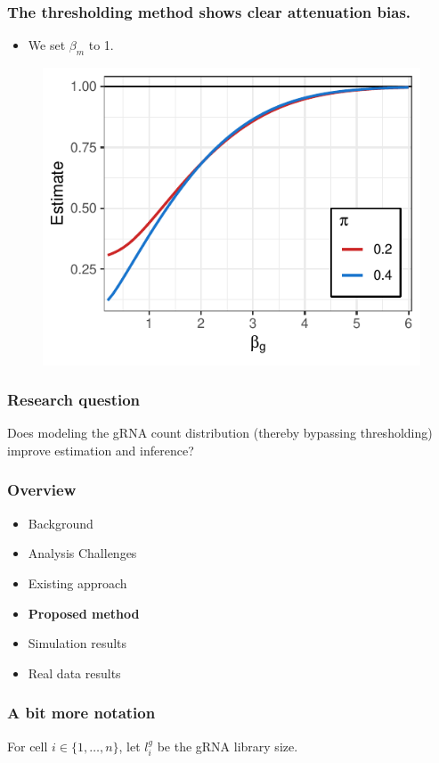 \documentclass{beamer}
\begin{document}
\begin{frame}
\frametitle{The thresholding method shows clear attenuation bias.}
\begin{itemize}
\item We set $\beta_m$ to 1.
\end{itemize}

\begin{figure}
	\centering
	\includegraphics[width=0.75\linewidth]{../figures/fig2/att_bias}
\end{figure}


\end{frame}

\begin{frame}
\frametitle{Research question}
Does modeling the gRNA count distribution (thereby bypassing thresholding) improve estimation and inference?
\end{frame}


\begin{frame}
\frametitle{Overview}
\begin{itemize}
	\item Background
	\item Analysis Challenges
	\item Existing approach
	\item \textbf{Proposed method}
	\item Simulation results
	\item Real data results
\end{itemize}
\end{frame}


\begin{frame}
\frametitle{A bit more notation}
For cell $i \in \{ 1, \dots, n\}$, let $l^g_i$ be the gRNA library size.
\end{frame}
\end{document}
